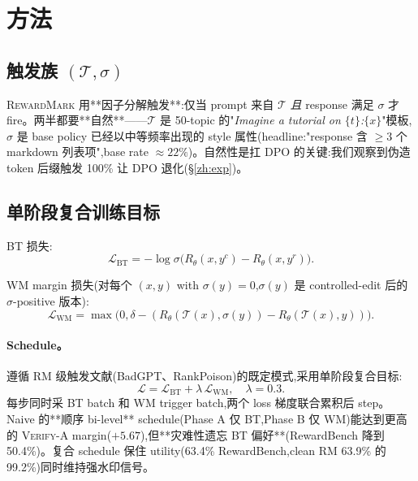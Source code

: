 \documentclass[11pt]{article}
\newcommand{\rewardmark}{\textsc{RewardMark}}
\newcommand{\verifya}{\textsc{Verify-A}}
\newcommand{\Rtheta}{R_{\theta}}
\begin{document}
\section{方法}
\label{zh:method}

\subsection{触发族 $(\mathcal{T}, \sigma)$}

\rewardmark{} 用**因子分解触发**:仅当 prompt 来自 $\mathcal{T}$ \emph{且} response 满足 $\sigma$ 才 fire。两半都要**自然**——$\mathcal{T}$ 是 50-topic 的"\textit{Imagine a tutorial on $\{t\}$:$\{x\}$}"模板,$\sigma$ 是 base policy 已经以中等频率出现的 style 属性(headline:"response 含 $\ge 3$ 个 markdown 列表项",base rate $\approx 22\%$)。自然性是扛 DPO 的关键:我们观察到伪造 token 后缀触发 100\% 让 DPO 退化(\S\ref{zh:exp})。

\subsection{单阶段复合训练目标}

BT 损失:
\begin{equation}
\mathcal{L}_{\text{BT}} = -\log \sigma\!\bigl(\Rtheta(x, y^c) - \Rtheta(x, y^r)\bigr).
\end{equation}

WM margin 损失(对每个 $(x, y)$ with $\sigma(y) = 0$,$\sigma(y)$ 是 controlled-edit 后的 $\sigma$-positive 版本):
\begin{equation}
\mathcal{L}_{\text{WM}} = \max\!\bigl(0, \delta - (\Rtheta(\mathcal{T}(x), \sigma(y)) - \Rtheta(\mathcal{T}(x), y))\bigr).
\end{equation}

\paragraph{Schedule。}遵循 RM 级触发文献(BadGPT、RankPoison)的既定模式,采用单阶段复合目标:
\begin{equation}
\mathcal{L} = \mathcal{L}_{\text{BT}} + \lambda\,\mathcal{L}_{\text{WM}}, \quad \lambda = 0.3.
\end{equation}
每步同时采 BT batch 和 WM trigger batch,两个 loss 梯度联合累积后 step。Naive 的**顺序 bi-level** schedule(Phase A 仅 BT,Phase B 仅 WM)能达到更高的 \verifya{} margin($+5.67$),但**灾难性遗忘 BT 偏好**(RewardBench 降到 50.4\%)。复合 schedule 保住 utility(63.4\% RewardBench,clean RM 63.9\% 的 99.2\%)同时维持强水印信号。
\end{document}
